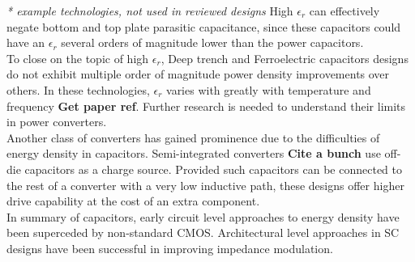 \documentclass[letterpaper,twocolumn,10pt]{article}
\begin{document}
\textit{* example technologies, not used in reviewed designs}
High $\epsilon_r$ can effectively negate bottom and top plate parasitic capacitance, since these capacitors could have an $\epsilon_r$ several orders of magnitude lower than the power capacitors.\\ 
To close on the topic of high $\epsilon_r$, Deep trench and Ferroelectric capacitors designs do not exhibit multiple order of magnitude power density improvements over others. In these technologies, $\epsilon_r$ varies with greatly with temperature \cite{Lee2004} and frequency \textbf{Get paper ref}. %
Further research is needed to understand their limits in power converters.\\
Another class of converters has gained prominence due to the difficulties of energy density in capacitors. Semi-integrated converters \textbf{Cite a bunch} use off-die capacitors as a charge source. Provided such capacitors can be connected to the rest of a converter with a very low inductive path, these designs offer higher drive capability at the cost of an extra component.\\
\indent In summary of capacitors, early circuit level approaches to energy density have been superceded by non-standard CMOS. Architectural level approaches in SC designs have been successful in improving impedance modulation.\\
\end{document}
